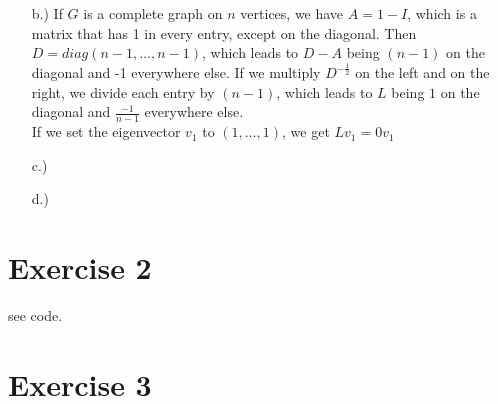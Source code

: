 \documentclass[%
   10pt,              %
   a4paper,           %
   DIV10,             %
]{scrartcl}%
\begin{document}
\begin{itemize}
	\item[b.)] If $G$ is a complete graph on $n$ vertices, we have $A = 1 - I$, which is a matrix that has 1 in every entry, except on the diagonal. Then $D = diag(n-1, \dots, n-1)$, which leads to $D - A$ being $(n-1)$ on the diagonal and -1 everywhere else. If we multiply $D^{-\frac{1}{2}}$ on the left and on the right, we divide each entry by $(n-1)$, which leads to $L$ being $1$ on the diagonal and $\frac{-1}{n-1}$ everywhere else.\\
	\noindent If we set the eigenvector $v_1$ to $(1, \dots, 1)$, we get $L v_1 = 0 v_1$
	\item[c.)] 
	\item[d.)] 
\end{itemize}
\section*{Exercise 2}
see code. 
\section*{Exercise 3}
\end{document}
